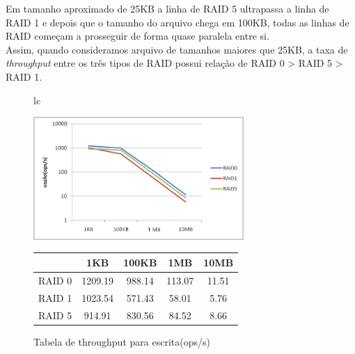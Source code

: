 	Em tamanho aproximado de 25KB a linha de RAID 5 ultrapassa a linha de RAID 1 e depois que o tamanho do arquivo chega em 100KB, todas as linhas de RAID começam a prosseguir de forma quase paralela entre si.
	\\
	
	Assim, quando consideramos arquivo de tamanhos maiores que 25KB, a taxa de \textit{throughput} entre os três tipos de RAID possui relação de RAID 0 > RAID 5 > RAID 1.
	\\
	
	\begin{figure}[h]
		\begin{tabular}{lc}
			\begin{minipage}{.50\textwidth}
				\begin{center}
					
					\includegraphics[clip,width=8.0cm]{images/resultados/throughput_escrita.png}
					\caption{Gráfico de throughput para escrita}
					\label{fig:throughput_e}
					
				\end{center}
				
			\end{minipage}
			
			\begin{minipage}{.5\textwidth}
				\makeatletter
				\def\@captype{table}
				\makeatother
				\caption{Tabela de throughput para escrita(ops/s)}
				\label{tab:throughput_e}
				\begin{center}
					\begin{tabular}{|c|c|c|c|c|} \hline
						& 1KB & 100KB & 1MB & 10MB \\ \hline
						
						RAID 0	& 1209.19 & 988.14 & 113.07 & 11.51\\ \hline
						RAID 1	& 1023.54 & 571.43 & 58.01  & 5.76 \\ \hline
						RAID 5	& 914.91  & 830.56 & 84.52  & 8.66 \\ \hline
						
						
					\end{tabular}
				\end{center}
				
			\end{minipage}
		\end{tabular}
	\end{figure}
	

